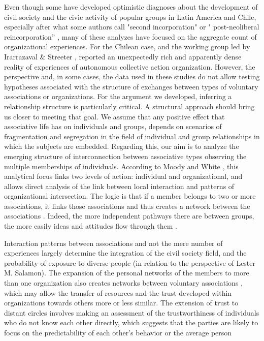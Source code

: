 Even though some have developed optimistic diagnoses about the development of civil society and the civic activity of popular groups in Latin America and Chile, especially after what some authors call "second incorporation" or " post-neoliberal reincorporation” \parencite{rossi_second_2015}, many of these analyzes have focused on the aggregate count of organizational experiences. For the Chilean case, \parencite{programa_de_las_naciones_unidas_para_el_desarrollo_desarrollo_2000} and the working group led by  Irarrazaval & Streeter \citeyear{irarrazaval_llona_sociedad_2017}, reported an unexpectedly rich and apparently dense reality of experiences of autonomous collective action organization. However, the perspective and, in some cases, the data used in these studies do not allow testing hypotheses associated with the structure of exchanges between types of voluntary associations or organizations. For the argument we developed, inferring a relationship structure is particularly critical. A structural approach should bring us closer to meeting that goal. We assume that any positive effect that associative life has on individuals and groups, depends on scenarios of fragmentation and segregation in the field of individual and group relationships in which the subjects are embedded. Regarding this, our aim is to analyze the emerging structure of interconnection between associative types observing the multiple memberships of individuals. According to Moody and White  \citeyear{moody_structural_2003}, this analytical focus links two levels of action: individual and organizational, and allows direct analysis of the link between local interaction and patterns of organizational intersection. The logic is that if a member belongs to two or more associations, it links those associations and thus creates a network between the associations \parencite{moody_structural_2003}. Indeed, the more independent pathways there are between groups, the more easily ideas and attitudes flow through them \parencite{moody_structural_2003}.
\bigskip

Interaction patterns between associations and not the mere number of experiences largely determine the integration of the civil society field, and the probability of exposure to diverse people (in relation to the perspective of Lester M. Salamon). The expansion of the personal networks of the members to more than one organization also creates networks between voluntary associations \parencite{moody_structural_2003, kenis_how_2002}, which may allow the transfer of resources and the trust developed within organizations towards others more or less similar. The extension of trust to distant circles involves making an assessment of the trustworthiness of individuals who do not know each other directly, which suggests that the parties are likely to focus on the predictability of each other's behavior or the average person \parencite{glanville_why_2016, paxton_association_2007, paxton_is_2015}
\bigskip

